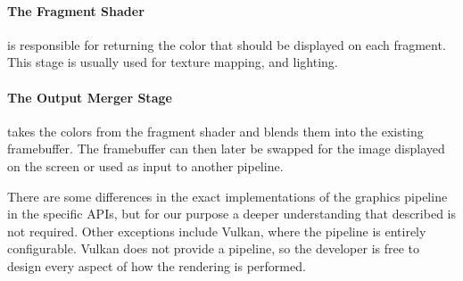 \paragraph{The Fragment Shader} is responsible for returning the color that should be displayed on each fragment.
This stage is usually used for texture mapping, and lighting.

\paragraph{The Output Merger Stage} takes the colors from the fragment shader and blends them into the existing framebuffer. 
The framebuffer can then later be swapped for the image displayed on the screen or used as input to another pipeline.

\vspace{1em}

\noindent There are some differences in the exact implementations of the graphics pipeline in the specific \glspl{API}, but for our purpose a deeper understanding that described is not required.
Other exceptions include Vulkan, where the pipeline is entirely configurable.
Vulkan does not provide a pipeline, so the developer is free to design every aspect of how the rendering is performed.

